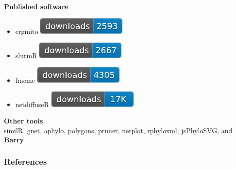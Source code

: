 \documentclass[aspectratio=169, 9pt]{beamer}
\begin{document}
\begin{frame}[t]
{\textbf{Published software}
\begin{itemize}
\item ergmito \includegraphics[width=.3\linewidth]{cran-downloads-ergmito.pdf}
\item slurmR \includegraphics[width=.3\linewidth]{cran-downloads-slurmr.pdf}
\item fmcmc \includegraphics[width=.3\linewidth]{cran-downloads-fmcmc.pdf}
\item netdiffuseR \includegraphics[width=.3\linewidth]{cran-downloads-netdiffuser.pdf}
\end{itemize}\pause

\textbf{Other tools}\\
similR, gnet, aphylo, polygons, pruner, netplot, rphyloxml, jsPhyloSVG,\pause{} and {\large \textbf{Barry}}

}

\end{frame}


\begin{frame}
\maketitle
\begin{center}
\scalebox{2}{\textcolor{uscgold}{Thanks!}}
\end{center}
\end{frame}

\renewcommand{\section}[2]{}%
\appendix
\begin{frame}[allowframebreaks]
\frametitle{References}
% 
% 
\printbibliography
\end{frame}
\end{document}
